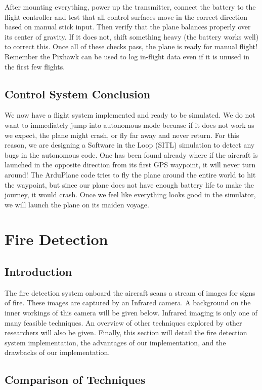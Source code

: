 \documentclass[12pt,journal,compsoc]{IEEEtran}
\begin{document}
After mounting everything, power up the transmitter, connect the battery to the flight controller and test that all control surfaces move in the correct direction based on manual stick input. Then verify that the plane balances properly over its center of gravity. If it does not, shift something heavy (the battery works well) to correct this. Once all of these checks pass, the plane is ready for manual flight! Remember the Pixhawk can be used to log in-flight data even if it is unused in the first few flights.

\subsection{Control System Conclusion}
We now have a flight system implemented and ready to be simulated. We do not want to immediately jump into autonomous mode becuase if it does not work as we expect, the plane might crash, or fly far away and never return. For this reason, we are designing a Software in the Loop (SITL) simulation to detect any bugs in the autonomous code. One has been found already where if the aircraft is launched in the opposite direction from its first GPS waypoint, it will never turn around! The ArduPlane code tries to fly the plane around the entire world to hit the waypoint, but since our plane does not have enough battery life to make the journey, it would crash. Once we feel like everything looks good in the simulator, we will launch the plane on its maiden voyage.

\section{Fire Detection}
\subsection{Introduction}
The fire detection system onboard the aircraft scans a stream of images for signs of fire. These images are captured by an Infrared camera. A background on the inner workings of this camera will be given below. Infrared imaging is only one of many feasible techniques. An overview of other techniques explored by other researchers will also be given. Finally, this section will detail the fire detection system implementation, the advantages of our implementation, and the drawbacks of our implementation. 

\subsection{Comparison of Techniques} \label{fire_comparison_section}
\end{document}
